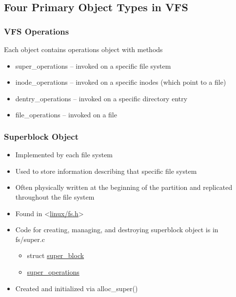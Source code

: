 \subsection{Four Primary Object Types in VFS}

% 
\begin{frame}[fragile]
    \frametitle{VFS Operations}

% 
Each object contains operations object with methods

    \begin{itemize}
        \item super\_operations -- invoked on a specific  file system
        \item inode\_operations -- invoked on a specific inodes (which point to a file)
        \item dentry\_operations -- invoked on a specific directory entry
        \item file\_operations -- invoked on a file 
    \end{itemize}
% 
\end{frame}
\begin{frame}[fragile]
    \frametitle{Superblock Object}


    \begin{itemize}
        \item Implemented by each file system
        \item Used to store information describing that specific file system
        \item Often physically written at the beginning of the partition and replicated throughout the file system
        \item Found in <\href{https://elixir.bootlin.com/linux/latest/source/include/linux/fs.h\#L1414}{linux/fs.h}>
        \item Code for creating, managing, and destroying superblock object is in fs/super.c
	    \begin{itemize}
	        \item struct \href{https://elixir.bootlin.com/linux/latest/source/include/linux/fs.h\#L1414}{super\_block}
	    \end{itemize}
	    \begin{itemize}
	        \item \href{https://elixir.bootlin.com/linux/v4.18.16/source/include/linux/fs.h\#L1824}{super\_operations}
      \end{itemize}
        \item Created and initialized via alloc\_super()
    \end{itemize}
% 
\end{frame}
